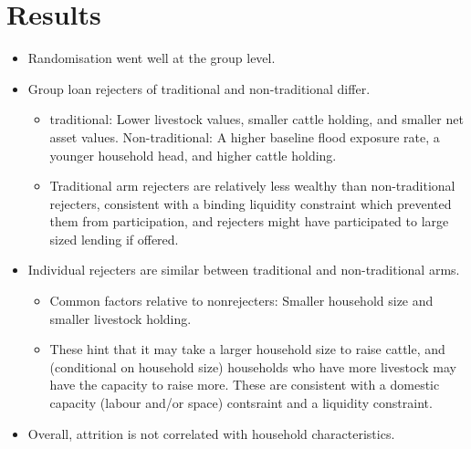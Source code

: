 \section{Results}
\label{SecResults}






\begin{mdframed}[style={SecItemize}, frametitle={Results}]
\begin{itemize}
\vspace{1.0ex}\setlength{\itemsep}{1.0ex}\setlength{\baselineskip}{12pt}
\item	Randomisation went well at the group level.
\item	Group loan rejecters of \textsf{traditional} and non-\textsf{traditional} differ.
	\begin{itemize}
	\vspace{1.0ex}\setlength{\itemsep}{1.0ex}\setlength{\baselineskip}{12pt}
	\item	\textsf{traditional}: Lower livestock values, smaller cattle holding, and smaller net asset values. Non-\textsf{traditional}: A higher baseline flood exposure rate, a younger household head, and higher cattle holding.
	\item	Traditional arm rejecters are relatively less wealthy than non-traditional rejecters, consistent with a binding liquidity constraint which prevented them from participation, and rejecters might have participated to large sized lending if offered.
	\end{itemize}
\item	Individual rejecters are similar between \textsf{traditional} and non-\textsf{traditional} arms. 
	\begin{itemize}
	\vspace{1.0ex}\setlength{\itemsep}{1.0ex}\setlength{\baselineskip}{12pt}
	\item	Common factors relative to nonrejecters: Smaller household size and smaller livestock holding.
	\item	These hint that it may take a larger household size to raise cattle, and (conditional on household size) households who have more livestock may have the capacity to raise more. These are consistent with a domestic capacity (labour and/or space) contsraint and a liquidity constraint.
	\end{itemize}
\item	Overall, attrition is not correlated with household characteristics.
	\begin{itemize}

\end{itemize}
\end{itemize}
\end{mdframed}
